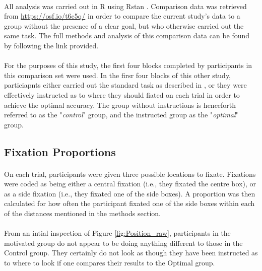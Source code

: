 \documentclass[12pt]{article}
\begin{document}
\paragraph{} All analysis was carried out in R \citep{R} using Rstan \citep{Rstan,Stan}. Comparison data was retrieved from \url{https://osf.io/t6c5q/} in order to compare the current study's data to a group without the presence of a clear goal, but who otherwise carried out the same task. The full methods and analysis of this comparison data can be found by following the link provided. 

\paragraph{} For the purposes of this study, the first four blocks completed by participants in this comparison set were used. In the firsr four blocks of this other study, particiapnts either carried out the standard task as described in \cite{clarke2015failure}, or they were effectively instructed as to where they should fiated on each trial in order to achieve the optimal accuracy. The group without instructions is henceforth referred to as the "\textit{control}" group, and the instructed group as the "\textit{optimal}" group.

\subsection*{Fixation Proportions}
\paragraph{} On each trial, participants were given three possible locations to fixate. Fixations were coded as being either a central fixation (i.e., they fixated the centre box), or as a side fixation (i.e., they fixated one of the side boxes). A proportion was then calculated for how often the participant fixated one of the side boxes within each of the distances mentioned in the methods section. 

\paragraph{} From an intial inspection of Figure \ref{fig:Position_raw}, participants in the motivated group do not appear to be doing anything different to those in the Control group. They certainly do not look as though they have been instructed as to where to look if one compares their results to the Optimal group. 
\end{document}
